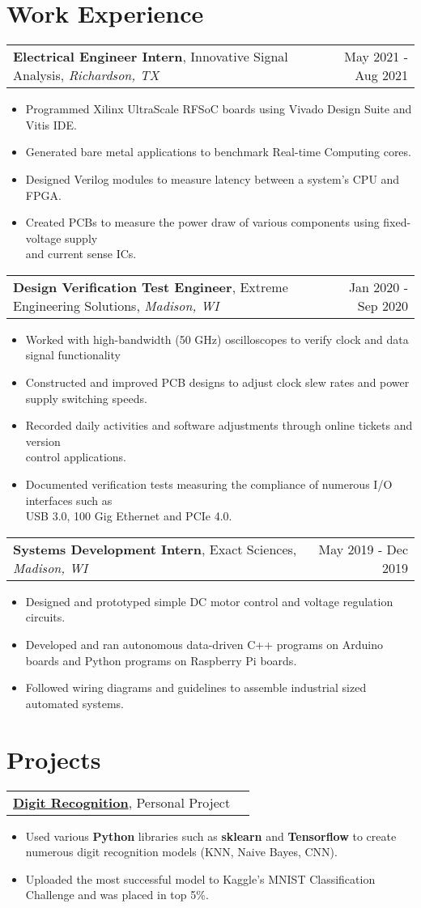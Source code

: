 \documentclass[letterpaper,11pt]{article}
\makeatletter
\newcommand{\exptitle}[4]{
  \vspace{7pt}
  \begin{tabular*}{1.00\textwidth}[t]{l@{\extracolsep{\fill}}r}
    \textbf{#1}, #2, \textit{#3} & #4 \\
  \end{tabular*}\vspace{-5pt}
}
\newcommand{\projtitle}[2]{
  \vspace{7pt}
  \begin{tabular*}{1.00\textwidth}[t]{l@{\extracolsep{\fill}}r}
    \textbf{#1}, #2 \\
  \end{tabular*}\vspace{-5pt}
}
\newcommand{\expstart}{\begin{itemize}[leftmargin=5mm]}
\newcommand{\expend}{\end{itemize}\vspace{-5pt}}
\newcommand{\expitem}[1]{\item\small{{#1 \vspace{-5pt}}}}
\makeatother
\begin{document}
\section{Work 
Experience}
 \vspace{-6pt}
  \exptitle{Electrical Engineer Intern}{Innovative Signal Analysis}{Richardson, TX}{May 2021 - Aug 2021}
  \expstart
    \expitem{Programmed Xilinx UltraScale RFSoC boards using Vivado Design Suite and Vitis IDE.}
    \expitem{Generated bare metal applications to benchmark Real-time Computing cores.}
    \expitem{Designed Verilog modules to measure latency between a system’s CPU and FPGA.}
    \expitem{Created PCBs to measure the power draw of various components using fixed-voltage supply \\ and current sense ICs.}
  \expend
  
  \exptitle{Design Verification Test Engineer}{Extreme Engineering Solutions}{Madison, WI}{Jan 2020 - Sep 2020}
  \expstart
    \expitem{Worked with high-bandwidth (50 GHz) oscilloscopes to verify clock and data signal functionality}
    \expitem{Constructed and improved PCB designs to adjust clock slew rates and power supply switching speeds.}
    \expitem{Recorded daily activities and software adjustments through online tickets and version \\ control applications.}
    \expitem{Documented verification tests measuring the compliance of numerous I/O interfaces such as \\ USB 3.0, 100 Gig Ethernet and PCIe 4.0.}
  \expend
  
  \exptitle{Systems Development Intern}{Exact Sciences}{Madison, WI}{May 2019 - Dec 2019}
  \expstart
    \expitem{Designed and prototyped simple DC motor control and voltage regulation circuits.}
    \expitem{Developed and ran autonomous data-driven C++ programs on Arduino \\ boards and Python programs on Raspberry Pi boards.}
    \expitem{Followed wiring diagrams and guidelines to assemble industrial sized automated systems.}
  \expend

\section{Projects}
  \vspace{-6pt}
  \projtitle{\href{https://github.com/jth1011/Digit-Recognizer}{Digit Recognition}}{Personal Project}
  \expstart
    \expitem{Used various \textbf{Python} libraries such as \textbf{sklearn} and \textbf{Tensorflow} to create numerous digit recognition models (KNN, Naive Bayes, CNN).}
    \expitem{Uploaded the most successful model to Kaggle's MNIST Classification Challenge and was placed in top 5\%.}
  \expend
  
\end{document}
